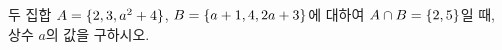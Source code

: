 두 집합 $A=\{2{,}\mkern3mu\mathopen{}3{,}\mkern3mu\mathopen{}a^2+4\}$, $B=\{a+1{,}\mkern3mu\mathopen{}4{,}\mkern3mu\mathopen{}2a+3\}$에 대하여 $A\cap B=\{2{,}\mkern3mu\mathopen{}5\}$일 때, 상수 $a$의 값을 구하시오.

